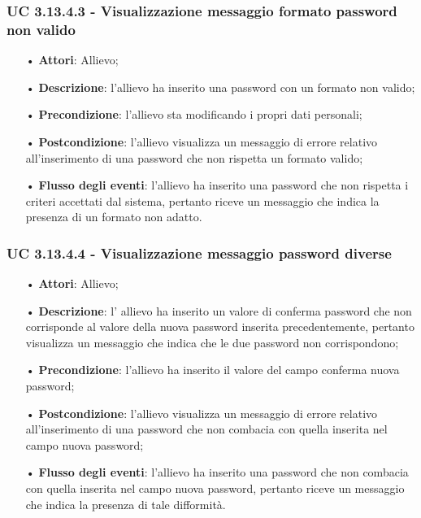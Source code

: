 \subsubsection{UC 3.13.4.3 - Visualizzazione messaggio formato password non valido}
\begin{itemize}
	\item[•]\textbf{Attori}: Allievo;
	\item[•]\textbf{Descrizione}: l'allievo ha inserito una password con un formato non valido;
	\item[•]\textbf{Precondizione}: l'allievo sta modificando i propri dati personali;
	\item[•]\textbf{Postcondizione}: l'allievo visualizza un messaggio di errore relativo all'inserimento di una password che non rispetta un formato valido; 
	\item[•]\textbf{Flusso degli eventi}: l'allievo ha inserito una password che non rispetta i criteri accettati dal sistema, pertanto riceve un messaggio che indica la presenza di un formato non adatto.
\end{itemize}

\subsubsection{UC 3.13.4.4 - Visualizzazione messaggio password diverse}
\begin{itemize}
	\item[•]\textbf{Attori}: Allievo;
	\item[•]\textbf{Descrizione}: l' allievo ha inserito un valore di conferma password che non corrisponde al valore della nuova password inserita precedentemente, pertanto visualizza un messaggio che indica che le due password non corrispondono;
	\item[•]\textbf{Precondizione}: l'allievo ha inserito il valore del campo conferma nuova password;
	\item[•]\textbf{Postcondizione}: l'allievo visualizza un messaggio di errore relativo all'inserimento di una password che non combacia con quella inserita nel campo nuova password; 
	\item[•]\textbf{Flusso degli eventi}: l'allievo ha inserito una password che non combacia con quella inserita nel campo nuova password, pertanto riceve un messaggio che indica la presenza di tale difformità.
\end{itemize}